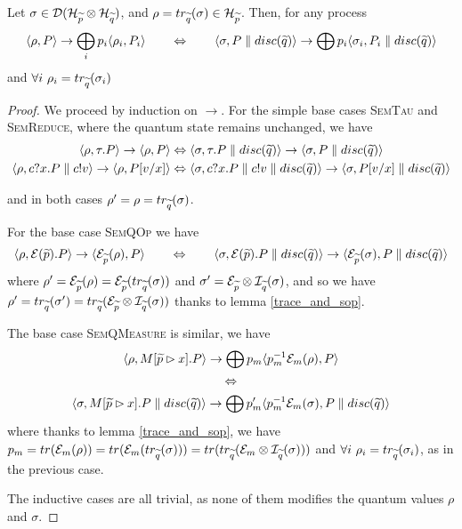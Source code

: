 \begin{lemma}\label{lemma_transition_partial_trace}
Let $\sigma \in  \mathcal{D}(\mathcal{H}_{\widetilde{p}} \otimes \mathcal{H}_{\widetilde{q}})$, and $\rho = tr_{\widetilde{q}}(\sigma) \in \mathcal{H}_{\widetilde{p}}$. Then, for any process 
\[ \langle\rho, P\rangle \rightarrow \bigoplus_i p_i \langle\rho_i, P_i\rangle 
\qquad\Leftrightarrow\qquad
\langle\sigma, P\parallel disc(\widetilde{q})\rangle \rightarrow \bigoplus p_i \langle\sigma_i, P_i\parallel disc(\widetilde{q})\rangle
\]
and $\forall i \ \rho_i = tr_{\widetilde{q}}(\sigma_i)$
\end{lemma}
\begin{proof}
We proceed by induction on $\rightarrow$. For the simple base cases {\footnotesize\scshape SemTau} and {\footnotesize\scshape SemReduce}, where the quantum state remains unchanged, we have 
\begin{align*}
\langle\rho, \tau.P\rangle \rightarrow \langle\rho, P\rangle
&\Leftrightarrow
\langle\sigma, \tau.P\parallel disc(\widetilde{q})\rangle \rightarrow \langle\sigma, P\parallel disc(\widetilde{q})\rangle
\\
 \langle\rho, c?x.P\parallel c!v\rangle \rightarrow \langle\rho, P[v / x]\rangle
&\Leftrightarrow
\langle\sigma, c?x.P\parallel c!v \parallel disc(\widetilde{q})\rangle \rightarrow \langle\sigma, P[v / x]\parallel disc(\widetilde{q})\rangle
\end{align*}

and in both cases $\rho' = \rho = tr_{\widetilde{q}}(\sigma)$.

For the base case {\footnotesize\scshape SemQOp} we have 
\[\langle\rho, \mathcal{E}(\widetilde{p}).P\rangle \rightarrow \langle\mathcal{E}_{\widetilde{p}}(\rho), P\rangle
\qquad\Leftrightarrow\qquad
\langle\sigma, \mathcal{E}(\widetilde{p}).P\parallel disc(\widetilde{q})\rangle \rightarrow \langle\mathcal{E}_{\widetilde{p}}(\sigma), P\parallel disc(\widetilde{q})\rangle\]
where $\rho' = \mathcal{E}_{\widetilde{p}}(\rho) = \mathcal{E}_{\widetilde{p}}(tr_{\widetilde{q}}(\sigma))$ and $\sigma' = \mathcal{E}_{\widetilde{p}}\otimes \mathcal{I}_{\widetilde{q}}(\sigma)$, and so we have $\rho' = tr_{\widetilde{q}}(\sigma') = tr_{\widetilde{q}}(\mathcal{E}_{\widetilde{p}}\otimes \mathcal{I}_{\widetilde{q}}(\sigma))$ thanks to lemma \ref{trace_and_sop}.


The base case {\footnotesize\scshape SemQMeasure} is similar, we have 
\begin{gather*}
\langle\rho, M[\widetilde{p} \rhd x].P\rangle \rightarrow \bigoplus p_m\langle p_m^{-1}\mathcal{E}_m(\rho), P\rangle \\
\Leftrightarrow \\
\langle\sigma, M[\widetilde{p} \rhd x].P\parallel disc(\widetilde{q})\rangle \rightarrow \bigoplus p'_m \langle p_m^{-1}\mathcal{E}_m(\sigma), P\parallel disc(\widetilde{q})\rangle
\end{gather*}
where thanks to lemma \ref{trace_and_sop}, we have $p_m = tr(\mathcal{E}_m(\rho)) = tr(\mathcal{E}_m(tr_{\widetilde{q}}(\sigma))) = tr(tr_{\widetilde{q}}(\mathcal{E}_m \otimes \mathcal{I}_{\widetilde{q}}(\sigma)))$ and $\forall i \ \rho_i = tr_{\widetilde{q}}(\sigma_i)$, as in the previous case.

The inductive cases are all trivial, as none of them modifies the quantum values $\rho$ and $\sigma$.
\end{proof}

